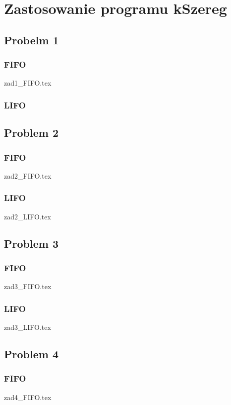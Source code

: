 \documentclass[twoside]{kInzynierka}
\begin{document}
   
\section      %
                {Zastosowanie programu kSzereg}
       
\subsection     {Probelm 1}
\subsubsection  {FIFO}
 {zad1_FIFO.tex}
\subsubsection  {LIFO}


\newpage
\subsection     {Problem 2}
\subsubsection  {FIFO}
 {zad2_FIFO.tex}
\subsubsection  {LIFO}
 {zad2_LIFO.tex}

\newpage
\subsection     {Problem 3}
\subsubsection  {FIFO}
 {zad3_FIFO.tex}
\subsubsection  {LIFO}
 {zad3_LIFO.tex}

\newpage
\subsection     {Problem 4}
\subsubsection  {FIFO}
 {zad4_FIFO.tex}
\end{document}
